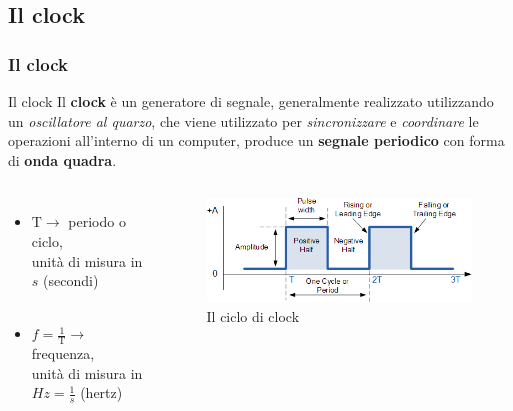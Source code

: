 \subsection[Il clock]{Il clock}
\begin{frame}
	\frametitle{Il clock}
	
	\begin{block}{Il clock}
		Il \textbf{clock} è un generatore di segnale, generalmente realizzato utilizzando un \textit{oscillatore al quarzo}, che viene utilizzato per \textit{sincronizzare} e \textit{coordinare} le operazioni all'interno di un computer, produce un \textbf{segnale periodico} con forma di \textbf{onda quadra}.
	\end{block}
	
	\begin{columns}
		\begin{itemize}
			\item $\mathrm{T} \rightarrow $ periodo o ciclo,\\
			unità di misura in\\
			$s$ (secondi)\\~\\
			\item $f = \frac{1}{\mathrm{T}} \rightarrow$ frequenza,\\
			unità di misura in $Hz = \frac{1}{s}$ (hertz)
		\end{itemize}
		
		\begin{figure}[!htbp]
			\centering 
			\includegraphics[width=1.0\linewidth]{images/2_le_architetture/clock.png}
			\caption{Il ciclo di clock}
		\end{figure}
		
	\end{columns}
	
\end{frame}


